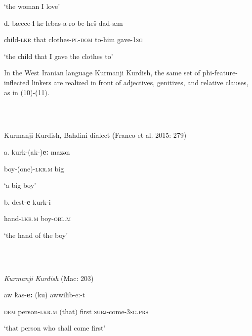 \documentclass[output=paper]{langsci/langscibook}
\begin{document}
\begin{styleSfondomedioiColorexxi}
‘the woman I love’
\end{styleSfondomedioiColorexxi}

\begin{styleGrigliamediaiiColorexi}
d.  bæcce-\textbf{i}   ke   lebas-a-ro     be-heš dad-æm
\end{styleGrigliamediaiiColorexi}

\begin{styleGrigliamediaiiColorexi}
child-\textsc{lkr}    that   clothes-\textsc{pl-dom}    to-him gave-\textsc{1sg} 
\end{styleGrigliamediaiiColorexi}

\begin{styleGrigliamediaiiColorexi}
‘the child that I gave the clothes to’
\end{styleGrigliamediaiiColorexi}

\begin{styleSfondomedioiColorexxi}
In the West Iranian language Kurmanji Kurdish, the same set of phi-feature-inflected linkers are realized in front of adjectives, genitives, and relative clauses, as in (10)-(11).  
\end{styleSfondomedioiColorexxi}

\ea%
    \label{ex:key:10}
    \gll\\
        \\
    \glt
    \z

           Kurmanji Kurdish, Bahdini dialect (Franco et al. 2015: 279)

a.  kurk-(ak-)\textbf{e:}     mazən    

boy-(one){}-\textsc{lkr.m}    big

‘a big boy’

b.  dest-\textbf{e}     kurk-i

hand{}-\textsc{lkr.m}    boy{}-\textsc{obl.m} 

‘the hand of the boy’

\ea%
    \label{ex:key:11}
    \gll\\
        \\
    \glt
    \z

          \textit{Kurmanji} \textit{Kurdish} (Mac\citealt{Kenzie1961}: 203)

aw   ḱas-\textbf{e:}     (ku)   awwil\=\i   b-e:-t

\textsc{dem}   person{}-\textsc{lkr.m}   (that)   first     \textsc{subj}{}-come-\textsc{3sg.prs}

‘that person who shall come first’           
\end{document}
